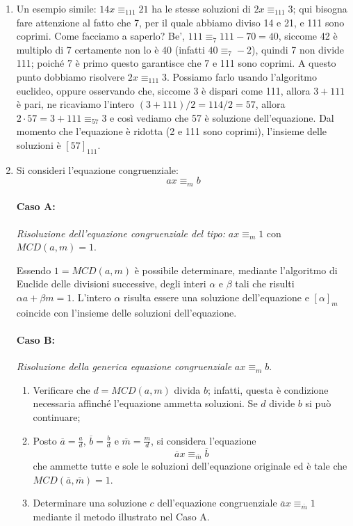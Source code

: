 \begin{example}
	\begin{enumerate}
	\item Un esempio simile: $14x \equiv_{111} 21$ ha le stesse soluzioni di $2x \equiv_{111} 3$; qui bisogna fare attenzione al fatto che
	7, per il quale abbiamo diviso 14 e 21, e 111 sono coprimi. Come facciamo a saperlo? Be’, $111 \equiv_{7} 111 - 70 = 40$,
	siccome 42 è multiplo di 7 certamente non lo è 40 (infatti $40 \equiv_{7} -2$), quindi 7 non divide 111; poiché 7 è primo questo garantisce che 7 e 111 sono coprimi. A questo punto dobbiamo risolvere $2x \equiv_{111} 3$. Possiamo farlo usando l’algoritmo euclideo, oppure osservando che, siccome 3 è dispari come 111, allora $3 + 111$ è pari, ne ricaviamo l’intero $(3 + 111)/2 = 114/2 = 57$, allora $2 \cdot 57 = 3 + 111 \equiv_{57} 3$ e così vediamo che 57 è soluzione dell'equazione. Dal momento che l’equazione è ridotta (2 e 111 sono coprimi), l’insieme delle soluzioni è $[57]_{111}$.

	\item Si consideri l'equazione congruenziale:
	\begin{equation}
		ax \equiv_{m} b
	\end{equation}
	\paragraph{Caso A:} \textit{Risoluzione dell'equazione congruenziale del tipo:} $ax \equiv_{m} 1$ con $MCD(a,m)=1$.
	
	Essendo $1=MCD(a,m)$ è possibile determinare, mediante l'algoritmo di Euclide delle divisioni successive, degli interi $\alpha$ e $\beta$ tali che risulti $\alpha a + \beta m = 1$. L'intero $\alpha$ risulta essere una soluzione dell'equazione e $[\alpha]_{m}$ coincide con l'insieme delle soluzioni dell'equazione.
	
	\paragraph{Caso B:} \textit{Risoluzione della generica equazione congruenziale} $ax \equiv_{m} b$.
	
	\begin{enumerate}
		\item Verificare che $d=MCD(a,m)$ divida $b$; infatti, questa è condizione necessaria affinché l'equazione ammetta soluzioni. Se $d$ divide $b$ si può continuare;
		\item Posto $\overline{a} = \frac{a}{d}$, $\overline{b}=\frac{b}{d}$ e $\overline{m}=\frac{m}{d}$, si considera l'equazione $$\overline{a}x \equiv_{\overline{m}} \overline{b}$$ che ammette tutte e sole le soluzioni dell'equazione originale ed è tale che $MCD(\overline{a},\overline{m})=1$.
		\item Determinare una soluzione $c$ dell'equazione congruenziale $\overline{a}x \equiv_{\overline{m}} 1$ mediante il metodo illustrato nel Caso A.
	\end{enumerate}
	

\end{enumerate}
\end{example}
